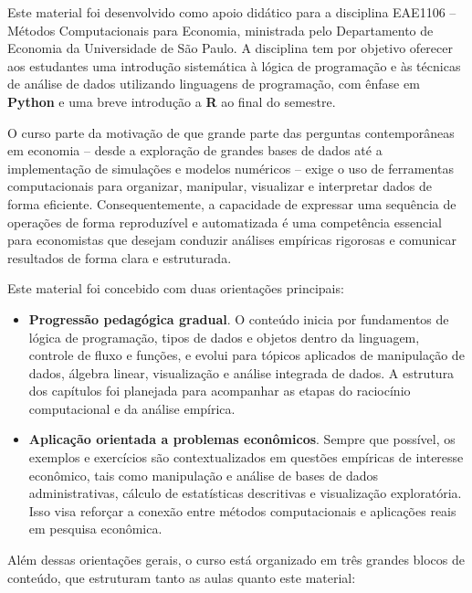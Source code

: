 \documentclass[
  brazilian,
  letterpaper,
  DIV=11,
  numbers=noendperiod]{scrreprt}
\begin{document}

Este material foi desenvolvido como apoio didático para a disciplina
EAE1106 -- Métodos Computacionais para Economia, ministrada pelo
Departamento de Economia da Universidade de São Paulo. A disciplina tem
por objetivo oferecer aos estudantes uma introdução sistemática à lógica
de programação e às técnicas de análise de dados utilizando linguagens
de programação, com ênfase em \textbf{Python} e uma breve introdução a
\textbf{R} ao final do semestre.

O curso parte da motivação de que grande parte das perguntas
contemporâneas em economia -- desde a exploração de grandes bases de
dados até a implementação de simulações e modelos numéricos -- exige o
uso de ferramentas computacionais para organizar, manipular, visualizar
e interpretar dados de forma eficiente. Consequentemente, a capacidade
de expressar uma sequência de operações de forma reproduzível e
automatizada é uma competência essencial para economistas que desejam
conduzir análises empíricas rigorosas e comunicar resultados de forma
clara e estruturada.

Este material foi concebido com duas orientações principais:

\begin{itemize}
\item
  \textbf{Progressão pedagógica gradual}. O conteúdo inicia por
  fundamentos de lógica de programação, tipos de dados e objetos dentro
  da linguagem, controle de fluxo e funções, e evolui para tópicos
  aplicados de manipulação de dados, álgebra linear, visualização e
  análise integrada de dados. A estrutura dos capítulos foi planejada
  para acompanhar as etapas do raciocínio computacional e da análise
  empírica.
\item
  \textbf{Aplicação orientada a problemas econômicos}. Sempre que
  possível, os exemplos e exercícios são contextualizados em questões
  empíricas de interesse econômico, tais como manipulação e análise de
  bases de dados administrativas, cálculo de estatísticas descritivas e
  visualização exploratória. Isso visa reforçar a conexão entre métodos
  computacionais e aplicações reais em pesquisa econômica.
\end{itemize}

Além dessas orientações gerais, o curso está organizado em três grandes
blocos de conteúdo, que estruturam tanto as aulas quanto este material:
\end{document}
